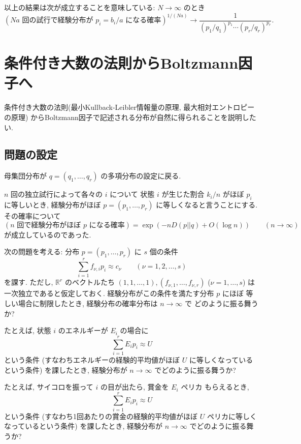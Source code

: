 \documentclass[12pt,twoside]{jarticle}
\newcommand\R{{\mathbb R}} %
\theoremstyle{definition} %
\theoremstyle{definition} %
\theoremstyle{definition} %
\numberwithin{theorem}{section}
\numberwithin{equation}{section}
\numberwithin{figure}{section}
\numberwithin{table}{section}
\begin{document}
以上の結果は次が成立することを意味している: $N\to\infty$ のとき
\[
(\text{$Na$ 回の試行で経験分布が $p_i=b_i/a$ になる確率})^{1/(Na)}\to\frac{1}{(p_1/q_1)^{p_1}\cdots(p_r/q_r)^{p_r}}.
\]



\section{条件付き大数の法則からBoltzmann因子へ}
\label{sec:Boltzmann-factors}

条件付き大数の法則(最小Kullback-Leibler情報量の原理, 最大相対エントロピーの原理)
からBoltzmann因子で記述される分布が自然に得られることを説明したい.


\subsection{問題の設定}

母集団分布が $q=(q_1,\ldots,q_r)$ の多項分布の設定に戻る.

$n$ 回の独立試行によって各々の $i$ について
状態 $i$ が生じた割合 $k_i/n$ がほぼ $p_i$ に等しいとき, 
経験分布がほぼ $p=(p_1,\ldots,p_r)$ に等しくなると言うことにする.
その確率について 
\[
(\text{$n$ 回で経験分布がほぼ $p$ になる確率})
=
\exp(-n D(p||q) + O(\log n))
\qquad (n\to\infty)
\]
が成立しているのであった. 

次の問題を考える: 分布 $p=(p_1,\ldots,p_r)$ に $s$ 個の条件
\[
\sum_{i=1}^r f_{\nu,i}p_i \approx c_\nu
\qquad (\nu=1,2,\ldots,s)
\tag{$*$}
\]
を課す. 
ただし, $\R^r$ のベクトルたち $(1,1,\ldots,1),(f_{\nu,1},\ldots,f_{\nu,r})$ 
($\nu=1,\ldots,s$) は一次独立であると仮定しておく.
経験分布がこの条件を満たす分布 $p$ にほぼ
等しい場合に制限したとき, 経験分布の確率分布は $n\to\infty$ で
どのように振る舞うか?

たとえば, 状態 $i$ のエネルギーが $E_i$ の場合に
\[
\sum_{i=1}^r E_i p_i \approx U
\]
という条件
(すなわちエネルギーの経験的平均値がほぼ $U$ に等しくなっているという条件)
を課したとき, 経験分布が $n\to\infty$ でどのように振る舞うか?

たとえば, サイコロを振って $i$ の目が出たら, 賞金を $E_i$ ペリカ
もらえるとき,
\[
\sum_{i=1}^r E_i p_i \approx U
\]
という条件
(すなわち1回あたりの賞金の経験的平均値がほぼ $U$ ペリカに等しくなっているという条件)
を課したとき, 経験分布が $n\to\infty$ でどのように振る舞うか?
\end{document}
